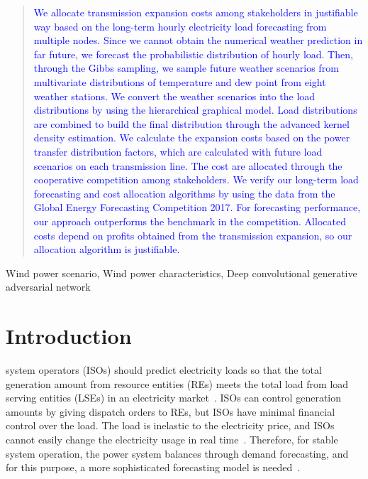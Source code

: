 \documentclass[journal]{IEEEtran} %
\begin{document}
\begin{abstract}
\textcolor{blue}{We allocate transmission expansion costs among stakeholders in justifiable way based on the long-term hourly electricity load forecasting from multiple nodes. Since we cannot obtain the numerical weather prediction in far future, we forecast the probabilistic distribution of hourly load. Then, through the Gibbs sampling, we sample future weather scenarios from multivariate distributions of temperature and dew point from eight weather stations. We convert the weather scenarios into the load distributions by using the hierarchical graphical model. Load distributions are combined to build the final distribution through the advanced kernel density estimation. 
%
We calculate the expansion costs based on the power transfer distribution factors, which are calculated with future load scenarios on each transmission line. The cost are allocated through the cooperative competition among stakeholders.
%
We verify our long-term load forecasting and cost allocation algorithms by using the data from the Global Energy Forecasting Competition 2017. For forecasting performance, our approach outperforms the benchmark in the competition. Allocated costs depend on profits obtained from the transmission expansion, so our allocation algorithm is justifiable.}
 

\end{abstract}




\begin{IEEEkeywords}
Wind power scenario, Wind power characteristics, Deep convolutional generative adversarial network
\end{IEEEkeywords}
	















\section{Introduction}
 system operators (ISOs) should predict electricity loads so that the total generation amount from resource entities (REs) meets the total load from load serving entities (LSEs) in an electricity market~\cite{chen2009short}. ISOs can control generation amounts by giving dispatch orders to REs, but ISOs have minimal financial control over the load. The load is inelastic to the electricity price, and ISOs cannot easily change the electricity usage in real time~\cite{Kirschen}. Therefore, for stable system operation, the power system balances through demand forecasting, and for this purpose, a more sophisticated forecasting model is needed~\cite{76685}.
\end{document}
